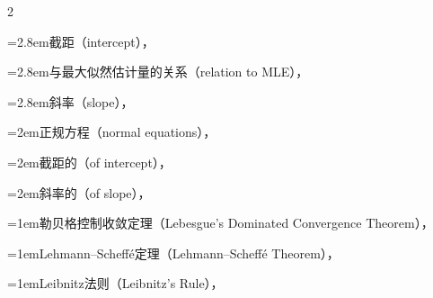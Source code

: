 \begin{multicols}{2}
\par\noindent\hangindent=2.8em\hspace*{1.8em}\label{idx:610}截距（intercept），\hyperref[idxocc:610:502]{\pageref*{idxocc:610:502}}\par
\par\noindent\hangindent=2.8em\hspace*{1.8em}\label{idx:611}与最大似然估计量的关系（relation to MLE），\hyperref[exercise:12.4]{\pageref*{exercise:12.4}}\par
\par\noindent\hangindent=2.8em\hspace*{1.8em}\label{idx:612}斜率（slope），\hyperref[eq:12.2.11]{\pageref*{eq:12.2.11}}\par
\par\noindent\hangindent=2em\hspace*{1em}\label{idx:613}正规方程（normal equations），\hyperref[exercise:11.25]{\pageref*{exercise:11.25}}\par
\par\noindent\hangindent=2em\hspace*{1em}\label{idx:614}截距的（of intercept），\hyperref[eq:11.3.9]{\pageref*{eq:11.3.9}}\par
\par\noindent\hangindent=2em\hspace*{1em}\label{idx:615}斜率的（of slope），\hyperref[eq:11.3.10]{\pageref*{eq:11.3.10}}\par
\par\addvspace{2pt}
\par\noindent\hangindent=1em\hspace*{0em}\label{idx:616}勒贝格控制收敛定理（Lebesgue’s Dominated Convergence Theorem），\hyperref[idxocc:616:88]{\pageref*{idxocc:616:88}}\par
\par\addvspace{2pt}
\par\noindent\hangindent=1em\hspace*{0em}\label{idx:617}Lehmann–Scheffé定理（Lehmann–Scheffé Theorem），\hyperref[thm:7.5.1]{\pageref*{thm:7.5.1}}\par
\par\addvspace{2pt}
\par\noindent\hangindent=1em\hspace*{0em}\label{idx:618}Leibnitz法则（Leibnitz’s Rule），\hyperref[thm:2.4.1]{\pageref*{thm:2.4.1}}\par

\end{multicols}
